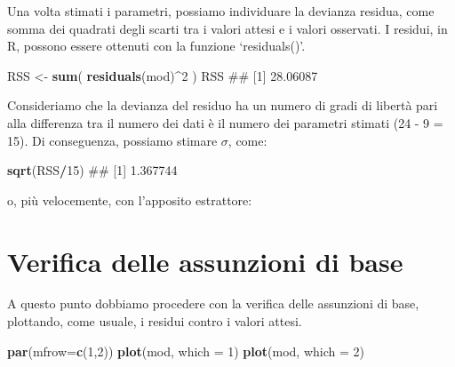 \documentclass[a4paper,12pt,oneside]{book}
\newenvironment{Shaded}{\begin{snugshade}}{\end{snugshade}}
\newcommand{\KeywordTok}[1]{\textcolor[rgb]{0.13,0.29,0.53}{\textbf{#1}}}
\newcommand{\DataTypeTok}[1]{\textcolor[rgb]{0.13,0.29,0.53}{#1}}
\newcommand{\DecValTok}[1]{\textcolor[rgb]{0.00,0.00,0.81}{#1}}
\newcommand{\StringTok}[1]{\textcolor[rgb]{0.31,0.60,0.02}{#1}}
\newcommand{\OperatorTok}[1]{\textcolor[rgb]{0.81,0.36,0.00}{\textbf{#1}}}
\newcommand{\NormalTok}[1]{#1}
\theoremstyle{definition}
\theoremstyle{definition}
\theoremstyle{definition}
\theoremstyle{remark}
\begin{document}
Una volta stimati i parametri, possiamo individuare la devianza residua,
come somma dei quadrati degli scarti tra i valori attesi e i valori
osservati. I residui, in R, possono essere ottenuti con la funzione
`residuals()'.

\begin{Shaded}
\begin{Highlighting}[]
\NormalTok{RSS <-}\StringTok{ }\KeywordTok{sum}\NormalTok{( }\KeywordTok{residuals}\NormalTok{(mod)}\OperatorTok{^}\DecValTok{2}\NormalTok{ )}
\NormalTok{RSS}
\NormalTok{## [1] 28.06087}
\end{Highlighting}
\end{Shaded}

Consideriamo che la devianza del residuo ha un numero di gradi di
libertà pari alla differenza tra il numero dei dati è il numero dei
parametri stimati (24 - 9 = 15). Di conseguenza, possiamo stimare
\(\sigma\), come:

\begin{Shaded}
\begin{Highlighting}[]
\KeywordTok{sqrt}\NormalTok{(RSS}\OperatorTok{/}\DecValTok{15}\NormalTok{)}
\NormalTok{## [1] 1.367744}
\end{Highlighting}
\end{Shaded}

o, più velocemente, con l'apposito estrattore:

\begin{Shaded}
\end{Shaded}

\section{Verifica delle assunzioni di
base}\label{verifica-delle-assunzioni-di-base}

A questo punto dobbiamo procedere con la verifica delle assunzioni di
base, plottando, come usuale, i residui contro i valori attesi.

\begin{Shaded}
\begin{Highlighting}[]
\KeywordTok{par}\NormalTok{(}\DataTypeTok{mfrow=}\KeywordTok{c}\NormalTok{(}\DecValTok{1}\NormalTok{,}\DecValTok{2}\NormalTok{))}
\KeywordTok{plot}\NormalTok{(mod, }\DataTypeTok{which =} \DecValTok{1}\NormalTok{)}
\KeywordTok{plot}\NormalTok{(mod, }\DataTypeTok{which =} \DecValTok{2}\NormalTok{)}
\end{Highlighting}
\end{Shaded}
\end{document}
